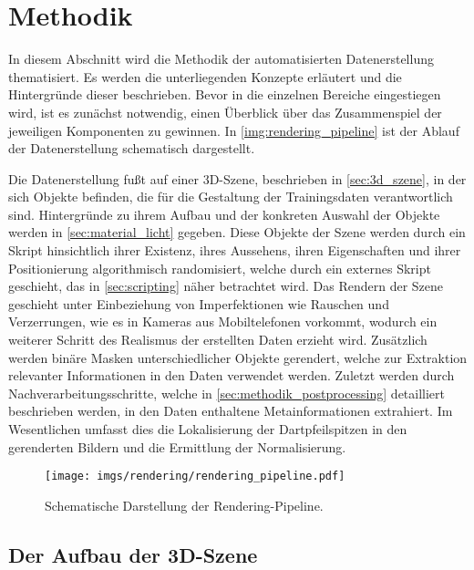 
\section{Methodik}
\label{sec:daten:methodik}

In diesem Abschnitt wird die Methodik der automatisierten Datenerstellung thematisiert. Es werden die unterliegenden Konzepte erläutert und die Hintergründe dieser beschrieben. Bevor in die einzelnen Bereiche eingestiegen wird, ist es zunächst notwendig, einen Überblick über das Zusammenspiel der jeweiligen Komponenten zu gewinnen. In \autoref{img:rendering_pipeline} ist der Ablauf der Datenerstellung schematisch dargestellt.

Die Datenerstellung fußt auf einer 3D-Szene, beschrieben in \autoref{sec:3d_szene}, in der sich Objekte befinden, die für die Gestaltung der Trainingsdaten verantwortlich sind. Hintergründe zu ihrem Aufbau und der konkreten Auswahl der Objekte werden in \autoref{sec:material_licht} gegeben. Diese Objekte der Szene werden durch ein Skript hinsichtlich ihrer Existenz, ihres Aussehens, ihren Eigenschaften und ihrer Positionierung algorithmisch randomisiert, welche durch ein externes Skript geschieht, das in \autoref{sec:scripting} näher betrachtet wird. Das Rendern der Szene geschieht unter Einbeziehung von Imperfektionen wie Rauschen und Verzerrungen, wie es in Kameras aus Mobiltelefonen vorkommt, wodurch ein weiterer Schritt des Realismus der erstellten Daten erzieht wird. Zusätzlich werden binäre Masken unterschiedlicher Objekte gerendert, welche zur Extraktion relevanter Informationen in den Daten verwendet werden. Zuletzt werden durch Nachverarbeitungsschritte, welche in \autoref{sec:methodik_postprocessing} detailliert beschrieben werden, in den Daten enthaltene Metainformationen extrahiert. Im Wesentlichen umfasst dies die Lokalisierung der Dartpfeilspitzen in den gerenderten Bildern und die Ermittlung der Normalisierung.

\begin{figure}
    \centering
    \texttt{[image: imgs/rendering/rendering\_pipeline.pdf]}
    \caption{Schematische Darstellung der Rendering-Pipeline.}
    \label{img:rendering_pipeline}
\end{figure}

\subsection{Der Aufbau der 3D-Szene} %
\label{sec:3d_szene}

